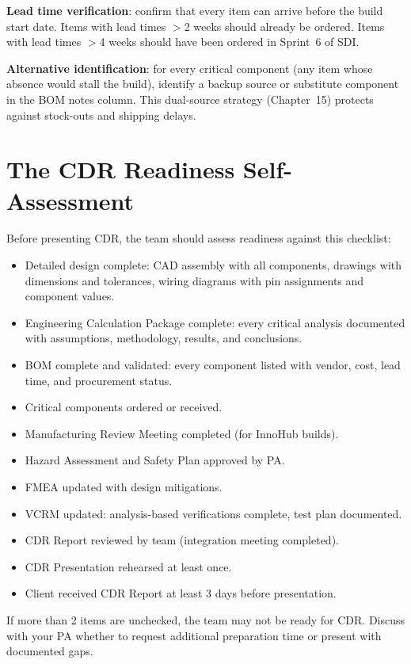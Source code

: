 \textbf{Lead time verification}: confirm that every item can arrive before the build start date. Items with lead times $>$2 weeks should already be ordered. Items with lead times $>$4 weeks should have been ordered in Sprint~6 of SDI.

\textbf{Alternative identification}: for every critical component (any item whose absence would stall the build), identify a backup source or substitute component in the BOM notes column. This dual-source strategy (Chapter~15) protects against stock-outs and shipping delays.

\section{The CDR Readiness Self-Assessment}
Before presenting CDR, the team should assess readiness against this checklist:

\begin{itemize}[nosep,leftmargin=1.5em]
\item[$\square$] Detailed design complete: CAD assembly with all components, drawings with dimensions and tolerances, wiring diagrams with pin assignments and component values.
\item[$\square$] Engineering Calculation Package complete: every critical analysis documented with assumptions, methodology, results, and conclusions.
\item[$\square$] BOM complete and validated: every component listed with vendor, cost, lead time, and procurement status.
\item[$\square$] Critical components ordered or received.
\item[$\square$] Manufacturing Review Meeting completed (for InnoHub builds).
\item[$\square$] Hazard Assessment and Safety Plan approved by PA.
\item[$\square$] FMEA updated with design mitigations.
\item[$\square$] VCRM updated: analysis-based verifications complete, test plan documented.
\item[$\square$] CDR Report reviewed by team (integration meeting completed).
\item[$\square$] CDR Presentation rehearsed at least once.
\item[$\square$] Client received CDR Report at least 3 days before presentation.
\end{itemize}

If more than 2 items are unchecked, the team may not be ready for CDR. Discuss with your PA whether to request additional preparation time or present with documented gaps.



